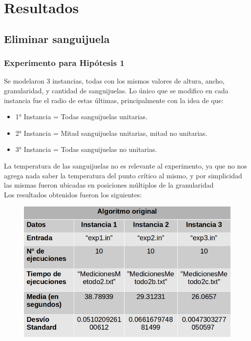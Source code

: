 \section{Resultados}

\subsection{Eliminar sanguijuela}
\subsubsection{Experimento para Hipótesis 1}
Se modelaron 3 instancias, todas con los mismos valores de altura, ancho, granularidad, y cantidad de sanguijuelas. Lo único que se modifico en cada instancia fue el radio de estas últimas, principalmente con la idea de que:
 \begin{itemize}
    \item 1° Instancia = Todas sanguijuelas unitarias.
    \item 2° Instancia = Mitad sanguijuelas unitarias, mitad no unitarias.
    \item 3° Instancia  = Todas sanguijuelas no unitarias.
 \end{itemize}
 La temperatura de las sanguijuelas no es relevante al experimento, ya que no nos agrega nada saber la temperatura del punto crítico al mismo, y por simplicidad las mismas fueron ubicadas en posiciones múltiplos de la granularidad \\


Los resultados obtenidos fueron los siguientes:

\begin{figure}[H]
    \centering
    \includegraphics[scale=0.6]{graphs/tablaOriginal.jpg}
    \end{figure}
        
